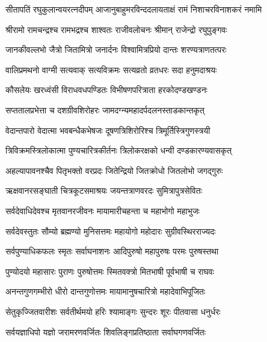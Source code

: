 

{सीतापतिं रघुकुलान्वयरत्नदीपम्}
{आजानुबाहुमरविन्ददलायताक्षं}
{रामं निशाचरविनाशकरं नमामि}

\twolineshloka
{श्रीरामो रामचन्द्रश्च रामभद्रश्च शाश्वतः}
{राजीवलोचनः श्रीमान् राजेन्द्रो रघुपुङ्गवः}

\twolineshloka
{जानकीवल्लभो जैत्रो जितामित्रो जनार्दनः}
{विश्वामित्रप्रियो दान्तः शरण्यत्राणतत्परः}

\twolineshloka
{वालिप्रमथनो वाग्मी सत्यवाक् सत्यविक्रमः}
{सत्यव्रतो व्रतधरः सदा हनुमदाश्रयः}

\twolineshloka
{कौसलेयः खरध्वंसी विराधवधपण्डितः}
{विभीषणपरित्राता हरकोदण्डखण्डनः}

\twolineshloka
{सप्ततालप्रभेत्ता च दशग्रीवशिरोहरः}
{जामदग्न्यमहादर्पदलनस्ताडकान्तकृत्}

\twolineshloka
{वेदान्तपारो वेदात्मा भवबन्धैकभेषजः}
{दूषणत्रिशिरोरिश्च त्रिमूर्तिस्त्रिगुणस्त्रयी}

\twolineshloka
{त्रिविक्रमस्त्रिलोकात्मा पुण्यचारित्रकीर्तनः}
{त्रिलोकरक्षको धन्वी दण्डकारण्यवासकृत्}

\twolineshloka
{अहल्यापावनश्चैव पितृभक्तो वरप्रदः}
{जितेन्द्रियो जितक्रोधो जितलोभो जगद्गुरुः}

\twolineshloka
{ऋक्षवानरसङ्घाती चित्रकूटसमाश्रयः}
{जयन्तत्राणवरदः सुमित्रापुत्रसेवितः}

\twolineshloka
{सर्वदेवाधिदेवश्च मृतवानरजीवनः}
{मायामारीचहन्ता च महाभोगो महाभुजः}

\twolineshloka
{सर्वदेवस्तुतः सौम्यो ब्रह्मण्यो मुनिसत्तमः}
{महायोगो महोदारः सुग्रीवस्थिरराज्यदः}

\twolineshloka
{सर्वपुण्याधिकफलः स्मृतः सर्वाघनाशनः}
{आदिपुरुषो महापुरुषः परमः पुरुषस्तथा}

\twolineshloka
{पुण्योदयो महासारः पुराणः पुरुषोत्तमः}
{स्मितवक्त्रो मितभाषी पूर्वभाषी च राघवः}

\twolineshloka
{अनन्तगुणगम्भीरो धीरो दान्तगुणोत्तमः}
{मायामानुषचारित्रो महादेवाभिपूजितः}

\twolineshloka
{सेतुकृज्जितवारीशः सर्वतीर्थमयो हरिः}
{श्यामाङ्गः सुन्दरः शूरः पीतवासा धनुर्धरः}

\twolineshloka
{सर्वयज्ञाधिपो यज्ञो जरामरणवर्जितः}
{शिवलिङ्गप्रतिष्ठाता सर्वाघगणवर्जितः}

